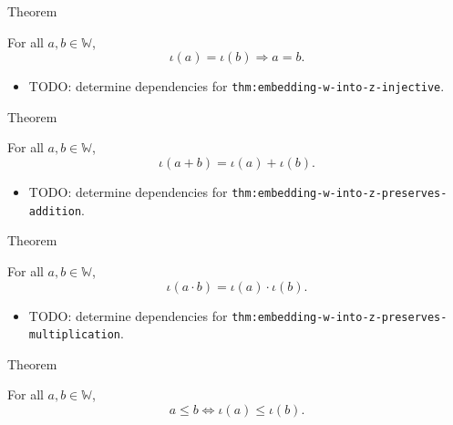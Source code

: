 \begin{theorembox}{Theorem}
\begin{theorem}
\label{thm:embedding-w-into-z-injective}
For all $a,b\in\mathbb{W}$,
\[
\iota(a)=\iota(b)\Longrightarrow a=b.
\]
\end{theorem}
\end{theorembox}

\begin{dependencies}
\begin{itemize}
  \item TODO: determine dependencies for \texttt{thm:embedding-w-into-z-injective}.
\end{itemize}
\end{dependencies}

\begin{theorembox}{Theorem}
\begin{theorem}
\label{thm:embedding-w-into-z-preserves-addition}
For all $a,b\in\mathbb{W}$,
\[
\iota(a+b)=\iota(a)+\iota(b).
\]
\end{theorem}
\end{theorembox}

\begin{dependencies}
\begin{itemize}
  \item TODO: determine dependencies for \texttt{thm:embedding-w-into-z-preserves-addition}.
\end{itemize}
\end{dependencies}

\begin{theorembox}{Theorem}
\begin{theorem}
\label{thm:embedding-w-into-z-preserves-multiplication}
For all $a,b\in\mathbb{W}$,
\[
\iota(a\cdot b)=\iota(a)\cdot\iota(b).
\]
\end{theorem}
\end{theorembox}

\begin{dependencies}
\begin{itemize}
  \item TODO: determine dependencies for \texttt{thm:embedding-w-into-z-preserves-multiplication}.
\end{itemize}
\end{dependencies}

\begin{theorembox}{Theorem}
\begin{theorem}
\label{thm:embedding-w-into-z-preserves-order}
For all $a,b\in\mathbb{W}$,
\[
a\le b \Longleftrightarrow \iota(a)\le\iota(b).
\]
\end{theorem}
\end{theorembox}

